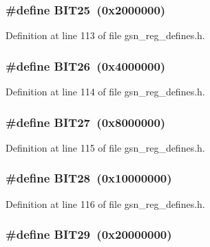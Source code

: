 \hypertarget{a00546_a3017291241a7269c1582154a3d3b1f09}{
\subsubsection[{BIT25}]{\setlength{\rightskip}{0pt plus 5cm}\#define BIT25~(0x2000000)}}
\label{a00546_a3017291241a7269c1582154a3d3b1f09}


Definition at line 113 of file gsn\_\-reg\_\-defines.h.

\hypertarget{a00546_a4f97a8963cc15a1a50521d855b8a1331}{
\subsubsection[{BIT26}]{\setlength{\rightskip}{0pt plus 5cm}\#define BIT26~(0x4000000)}}
\label{a00546_a4f97a8963cc15a1a50521d855b8a1331}


Definition at line 114 of file gsn\_\-reg\_\-defines.h.

\hypertarget{a00546_afdd1584eaddf508717554b35a600b0fd}{
\subsubsection[{BIT27}]{\setlength{\rightskip}{0pt plus 5cm}\#define BIT27~(0x8000000)}}
\label{a00546_afdd1584eaddf508717554b35a600b0fd}


Definition at line 115 of file gsn\_\-reg\_\-defines.h.

\hypertarget{a00546_a4361544977e96fb8eb8387ff0feaf6b6}{
\subsubsection[{BIT28}]{\setlength{\rightskip}{0pt plus 5cm}\#define BIT28~(0x10000000)}}
\label{a00546_a4361544977e96fb8eb8387ff0feaf6b6}


Definition at line 116 of file gsn\_\-reg\_\-defines.h.

\hypertarget{a00546_adb368e517e545da53d8aace5923649e1}{
\subsubsection[{BIT29}]{\setlength{\rightskip}{0pt plus 5cm}\#define BIT29~(0x20000000)}}
\label{a00546_adb368e517e545da53d8aace5923649e1}



